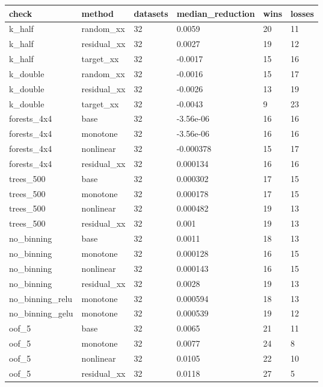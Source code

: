 \begin{tabular}{llllll}
\toprule
check & method & datasets & median\_reduction & wins & losses \\
\midrule
k\_half & random\_xx & 32 & 0.0059 & 20 & 11 \\
k\_half & residual\_xx & 32 & 0.0027 & 19 & 12 \\
k\_half & target\_xx & 32 & -0.0017 & 15 & 16 \\
k\_double & random\_xx & 32 & -0.0016 & 15 & 17 \\
k\_double & residual\_xx & 32 & -0.0026 & 13 & 19 \\
k\_double & target\_xx & 32 & -0.0043 & 9 & 23 \\
forests\_4x4 & base & 32 & -3.56e-06 & 16 & 16 \\
forests\_4x4 & monotone & 32 & -3.56e-06 & 16 & 16 \\
forests\_4x4 & nonlinear & 32 & -0.000378 & 15 & 17 \\
forests\_4x4 & residual\_xx & 32 & 0.000134 & 16 & 16 \\
trees\_500 & base & 32 & 0.000302 & 17 & 15 \\
trees\_500 & monotone & 32 & 0.000178 & 17 & 15 \\
trees\_500 & nonlinear & 32 & 0.000482 & 19 & 13 \\
trees\_500 & residual\_xx & 32 & 0.001 & 19 & 13 \\
no\_binning & base & 32 & 0.0011 & 18 & 13 \\
no\_binning & monotone & 32 & 0.000128 & 16 & 15 \\
no\_binning & nonlinear & 32 & 0.000143 & 16 & 15 \\
no\_binning & residual\_xx & 32 & 0.0028 & 19 & 13 \\
no\_binning\_relu & monotone & 32 & 0.000594 & 18 & 13 \\
no\_binning\_gelu & monotone & 32 & 0.000539 & 19 & 12 \\
oof\_5 & base & 32 & 0.0065 & 21 & 11 \\
oof\_5 & monotone & 32 & 0.0077 & 24 & 8 \\
oof\_5 & nonlinear & 32 & 0.0105 & 22 & 10 \\
oof\_5 & residual\_xx & 32 & 0.0118 & 27 & 5 \\
\bottomrule
\end{tabular}
